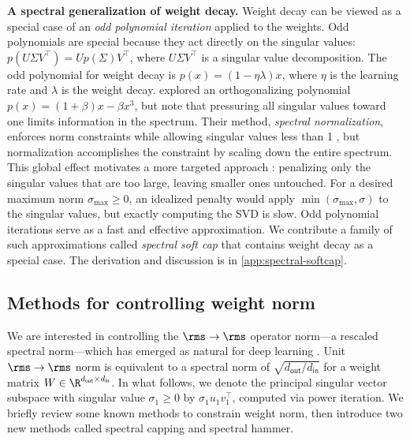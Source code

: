 \textbf{A spectral generalization of weight decay.} Weight decay can be viewed as a special case of an \textit{odd polynomial iteration} applied to the weights. Odd polynomials are special because they act directly on the singular values: $p(U \Sigma V^\top) = U p(\Sigma) V^\top$, where $U\Sigma V^\top$ is a singular value decomposition. The odd polynomial for weight decay is $p(x) = (1 - \eta \lambda) x$, where $\eta$ is the learning rate and $\lambda$ is the weight decay. \citet{cisse2017parseval} explored an orthogonalizing polynomial $p(x) = (1 + \beta)x - \beta x^3$, but \citet{miyato2018spectralnormalizationgenerativeadversarial} note that pressuring all singular values toward one limits information in the spectrum. Their method, \textit{spectral normalization}, enforces norm constraints while allowing singular values less than 1 \citep{gouk2020regularisationneuralnetworksenforcing}, but normalization accomplishes the constraint by scaling down the entire spectrum. This global effect motivates a more targeted approach
: penalizing only the singular values that are too large, leaving smaller ones untouched. For a desired maximum norm $\sigma_\text{max} \geq 0$, an idealized penalty would apply $\min(\sigma_\text{max}, \sigma)$ to the singular values, but exactly computing the SVD is slow. Odd polynomial iterations serve as a fast and effective approximation. We contribute a family of such approximations called \textit{spectral soft cap} that contains weight decay as a special case. The derivation and discussion is in \cref{app:spectral-softcap}.

\subsection{Methods for controlling weight norm}
\label{sec:methods_weight_constraints}

We are interested in controlling the $\rms \to \rms$ operator norm---a rescaled spectral norm---which has emerged as natural for deep learning \citep{spectral-condition,bernstein2024duality}. Unit $\rms\to\rms$ norm is equivalent to a spectral norm of $\sqrt{d_\mathsf{out}/d_\mathsf{in}}$ for a weight matrix $W \in \R^{d_\mathsf{out} \times d_\mathsf{in}}$. In what follows, we denote the principal singular vector subspace with singular value $\sigma_1 \geq 0$ by $\sigma_1 u_1 v_1^\top$, computed via power iteration. We briefly review some known methods to constrain weight norm, then introduce two new methods called spectral capping and spectral hammer.

